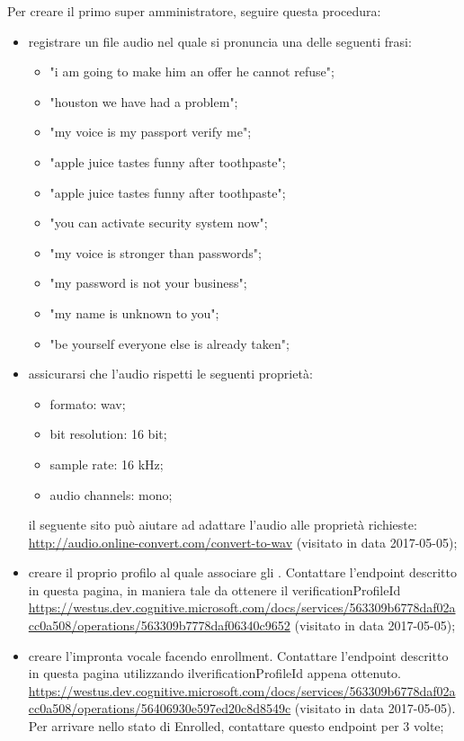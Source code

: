 Per creare il primo super amministratore, seguire questa procedura:
\begin{itemize}
	\item registrare un file audio nel quale si pronuncia una delle seguenti frasi:
	\begin{itemize}
		\item "i am going to make him an offer he cannot refuse";
		\item "houston we have had a problem";
		\item "my voice is my passport verify me";
		\item "apple juice tastes funny after toothpaste";
		\item "apple juice tastes funny after toothpaste";
		\item "you can activate security system now";
		\item "my voice is stronger than passwords";
		\item "my password is not your business";
		\item "my name is unknown to you";
		\item "be yourself everyone else is already taken";
	\end{itemize}
	\item assicurarsi che l'audio rispetti le seguenti proprietà:
	\begin{itemize}
		\item formato: wav;
		\item bit resolution: 16 bit;
		\item sample rate: 16 kHz;
		\item audio channels: mono;
	\end{itemize}
	il seguente sito può aiutare ad adattare l'audio alle proprietà richieste: \url{http://audio.online-convert.com/convert-to-wav} (visitato in data 2017-05-05);
	\item creare il proprio profilo al quale associare gli . Contattare l'endpoint descritto in questa pagina, in maniera tale da ottenere il verificationProfileId\\ \url{https://westus.dev.cognitive.microsoft.com/docs/services/563309b6778daf02acc0a508/operations/563309b7778daf06340c9652} (visitato in data 2017-05-05);
	\item creare l'impronta vocale facendo enrollment. Contattare l'endpoint descritto in questa pagina utilizzando ilverificationProfileId appena ottenuto.\\ \url{https://westus.dev.cognitive.microsoft.com/docs/services/563309b6778daf02acc0a508/operations/56406930e597ed20c8d8549c} (visitato in data 2017-05-05). Per arrivare nello stato di Enrolled, contattare questo endpoint per 3 volte;

\end{itemize}
